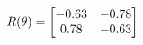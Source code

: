 \documentclass[preview]{standalone}
\begin{document}
\begin{align*}
\special{dvisvgm:raw <g id='unique000'>}R(\theta) = \begin{bmatrix}-0.63 & -0.78\\0.78 & -0.63\end{bmatrix}\special{dvisvgm:raw </g>}
\end{align*}
\end{document}
